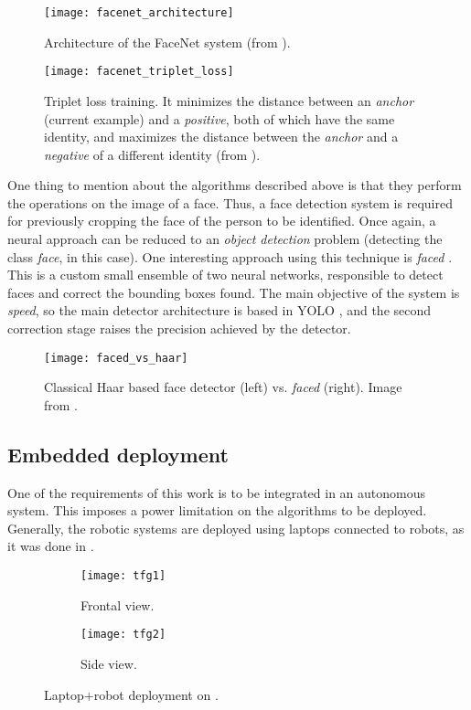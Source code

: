 \begin{figure}[h]
	\centering
	\texttt{[image: facenet\_architecture]}
	\caption{Architecture of the FaceNet system (from \cite{facenet}).}
	\label{fig:1_facenet_architecture}
\end{figure}



\begin{figure}[h]
	\centering
	\texttt{[image: facenet\_triplet\_loss]}
	\caption{Triplet loss training. It minimizes the distance between an \emph{anchor} (current example) and a \emph{positive}, both of which have the same identity, and maximizes the distance between the \emph{anchor} and a \emph{negative} of a different identity (from \cite{facenet}).}
	\label{fig:1_facenet_triplet_loss}
\end{figure}


One thing to mention about the algorithms described above is that they perform the operations on the image of a face. Thus, a face detection system is required for previously cropping the face of the person to be identified. Once again, a neural approach can be reduced to an \textit{object detection} problem (detecting the class \textit{face}, in this case). One interesting approach using this technique is \textit{faced} \cite{faced}. This is a custom small ensemble of two neural networks, responsible to detect faces and correct the bounding boxes found. The main objective of the system is \textit{speed}, so the main detector architecture is based in YOLO \cite{yolov1}, and the second correction stage raises the precision achieved by the detector.

\begin{figure}[h]
	\centering
	\texttt{[image: faced\_vs\_haar]}
	\caption{Classical Haar based face detector \cite{violajones} (left) vs. \textit{faced} (right). Image from \cite{faced}.}
	\label{fig:1_faced_vs_haar}
\end{figure}


\subsection{Embedded deployment}
One of the requirements of this work is to be integrated in an autonomous system. This imposes a power limitation on the algorithms to be deployed. Generally, the robotic systems are deployed using laptops connected to robots, as it was done in \cite{tfg}.

\begin{figure}[h]
	\centering
	\begin{subfigure}[h]{0.4\linewidth}
		\texttt{[image: tfg1]}
		\caption{Frontal view.}
		\label{fig:3_turtlebot_front}
	\end{subfigure}
	\begin{subfigure}[h]{0.4\linewidth}
		\texttt{[image: tfg2]}
		\caption{Side view.}
		\label{fig:3_turtlebot_side}
	\end{subfigure}
	\caption{Laptop+robot deployment on \cite{tfg}.}
	\label{fig:1_real_tfg}
\end{figure}

